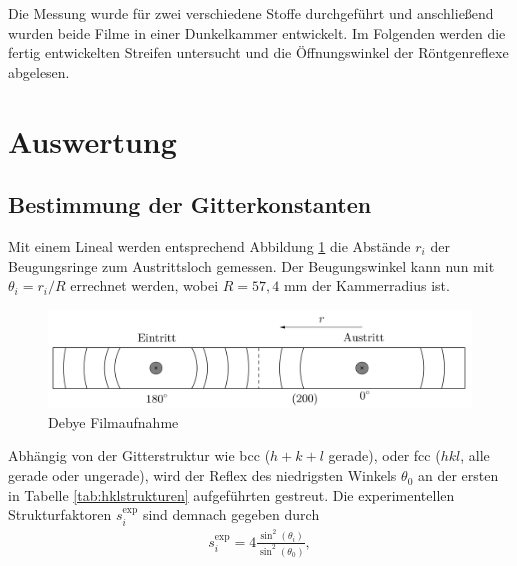 Die Messung wurde für zwei verschiedene Stoffe durchgeführt und anschließend wurden beide Filme in einer Dunkelkammer entwickelt. Im Folgenden werden die fertig entwickelten Streifen untersucht und die Öffnungswinkel der Röntgenreflexe abgelesen.  

\section{Auswertung}
\subsection{Bestimmung der Gitterkonstanten}
Mit einem Lineal werden entsprechend Abbildung \ref{pic:debyefilm} die Abstände $r_i$ der Beugungsringe zum Austrittsloch gemessen. Der 
Beugungswinkel kann nun mit $\theta_i = r_i/R$ errechnet werden, wobei $R=57,4$ mm der Kammerradius ist. 
\begin{figure}[H]
 \includegraphics[width=\textwidth]{../pics/debyestreifen.jpg}
 \caption{Debye Filmaufnahme}
 \label{pic:debyefilm}
\end{figure}
\noindent Abhängig von der Gitterstruktur wie bcc ($h+k+l$ gerade), oder fcc ($hkl$, alle gerade oder ungerade),
wird der Reflex des niedrigsten Winkels $\theta_0$ an der ersten in Tabelle \ref{tab:hklstrukturen} aufgeführten
gestreut. Die experimentellen Strukturfaktoren $s^\text{exp}_i$ sind demnach gegeben durch
\begin{align}
 s^\text{exp}_i = 4\frac{\sin^2(\theta_i)}{\sin^2(\theta_0)},
 \label{eq:structExp}
\end{align}
